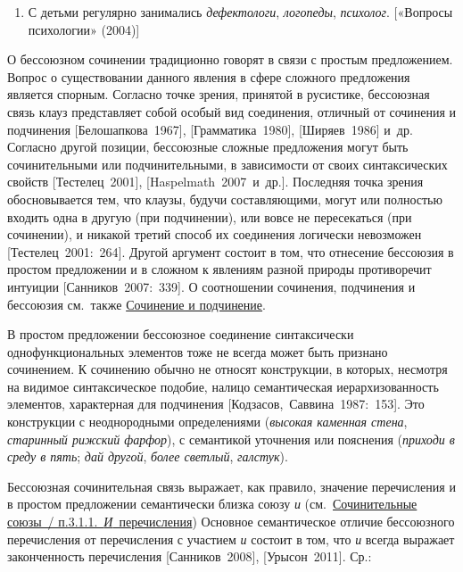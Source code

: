 \begin{enumerate}
  \def\labelenumi{(\arabic{enumi})}
  \setcounter{enumi}{64}
  \item
        С детьми регулярно занимались \textit{дефектологи}, \textit{логопеды},
        \textit{психолог}. {[}«Вопросы психологии» (2004){]}
\end{enumerate}

О бессоюзном сочинении традиционно говорят в связи с простым
предложением. Вопрос о существовании данного явления в сфере сложного
предложения является спорным. Согласно точке зрения, принятой в
русистике, бессоюзная связь клауз представляет собой особый вид
соединения, отличный от сочинения и подчинения {[}Белошапкова~1967{]},
{[}Грамматика~1980{]}, {[}Ширяев~1986{]} и~др. Согласно другой позиции,
бессоюзные сложные предложения могут быть сочинительными или
подчинительными, в зависимости от своих синтаксических свойств
{[}Тестелец~2001{]}, {[}Haspelmath~2007~и~др.{]}. Последняя точка зрения
обосновывается тем, что клаузы, будучи составляющими, могут или
полностью входить одна в другую (при подчинении), или вовсе не
пересекаться (при сочинении), и никакой третий способ их соединения
логически невозможен {[}Тестелец~2001:~264{]}. Другой аргумент состоит в
том, что отнесение бессоюзия в простом предложении и в сложном к
явлениям разной природы противоречит интуиции {[}Санников~2007:~339{]}.
О соотношении сочинения, подчинения и бессоюзия см.~также
\underline{Сочинение и подчинение}.

В простом предложении бессоюзное соединение синтаксически
однофункциональных элементов тоже не всегда может быть признано
сочинением. К сочинению обычно не относят конструкции, в которых,
несмотря на видимое синтаксическое подобие, налицо семантическая
иерархизованность элементов, характерная для подчинения
{[}Кодзасов,~Саввина~1987:~153{]}. Это конструкции с неоднородными
определениями (\textit{высокая каменная стена}, \textit{старинный рижский
  фарфор}), с семантикой уточнения или пояснения (\textit{приходи в среду в
  пять}; \textit{дай другой}, \textit{более светлый}, \textit{галстук}).

Бессоюзная сочинительная связь выражает, как правило, значение
перечисления и в простом предложении семантически близка союзу \textit{и}
(см.~\underline{Сочинительные союзы~/ п.3.1.1.~\textit{И}~перечисления})
Основное семантическое отличие бессоюзного перечисления от перечисления
с участием \textit{и} состоит в том, что \textit{и} всегда выражает
законченность перечисления {[}Санников~2008{]}, {[}Урысон~2011{]}. Ср.:

